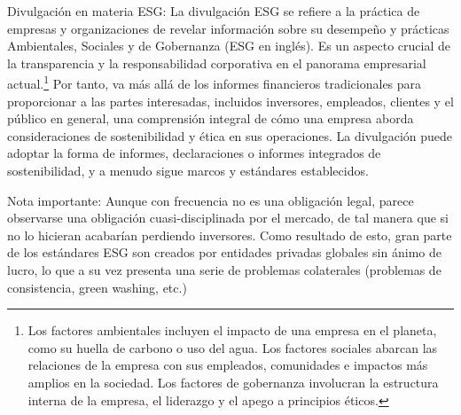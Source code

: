 \documentclass[10pt,a4paper]{article}
\begin{document}
Divulgación en materia ESG: La divulgación ESG se refiere a la práctica de empresas y organizaciones de revelar información sobre su desempeño y prácticas Ambientales, Sociales y de Gobernanza (ESG en inglés). Es un aspecto crucial de la transparencia y la responsabilidad corporativa en el panorama empresarial actual.\footnote{%
    Los factores ambientales incluyen el impacto de una empresa en el planeta, como su huella de carbono o uso del agua. Los factores sociales abarcan las relaciones de la empresa con sus empleados, comunidades e impactos más amplios en la sociedad. Los factores de gobernanza involucran la estructura interna de la empresa, el liderazgo y el apego a principios éticos.
} Por tanto, va más allá de los informes financieros tradicionales para proporcionar a las partes interesadas, incluidos inversores, empleados, clientes y el público en general, una comprensión integral de cómo una empresa aborda consideraciones de sostenibilidad y ética en sus operaciones. La divulgación puede adoptar la forma de informes, declaraciones o informes integrados de sostenibilidad, y a menudo sigue marcos y estándares establecidos. 

Nota importante: Aunque con frecuencia no es una obligación legal, parece observarse una obligación cuasi-disciplinada por el mercado, de tal manera que si no lo hicieran acabarían perdiendo inversores. Como resultado de esto, gran parte de los estándares ESG son creados por entidades privadas globales sin ánimo de lucro, lo que a su vez presenta una serie de problemas colaterales (problemas de consistencia, green washing, etc.)
\end{document}
